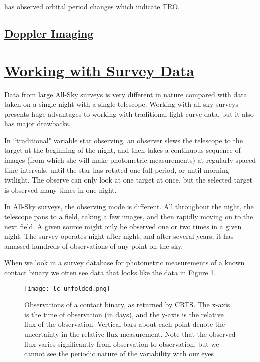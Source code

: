 \documentclass[12pt]{article} %
\numberwithin{equation}{section} %
\begin{document}
\citet{qian2001orbital} has observed orbital period changes which indicate TRO. 

\subsection[Doppler Imaging]{\hyperlink{toc}{Doppler Imaging}} \label{sec: doppler_imaging}



\section[Working with Survey Data]{\hyperlink{toc}{Working with Survey Data}} \label{sec: Working with Survey Data}

Data from large All-Sky surveys is very different in nature compared with data taken on a single night with a single telescope. Working with all-sky surveys presents huge advantages to working with traditional light-curve data, but it also has major drawbacks.

In ``traditional" variable star observing, an observer slews the telescope to the target at the beginning of the night, and then takes a continuous sequence of images (from which she will make photometric measurements) at regularly spaced time intervals, until the star has rotated one full period, or until morning twilight. The observe can only look at one target at once, but the selected target is observed many times in one night.

In All-Sky surveys, the observing mode is different. All throughout the night, the telescope pans to a field, taking a few images, and then rapidly moving on to the next field. A given source might only be observed one or two times in a given night. The survey operates night after night, and after several years, it has amassed hundreds of observations of any point on the sky.

When we look in a survey database for photometric measurements of a known contact binary we often see data that looks like the data in Figure \ref{fig: lc_unfolded}. 

\begin{figure}[H]
\centering
\texttt{[image: lc\_unfolded.png]}
\caption{Observations of a contact binary, as returned by CRTS. The x-axis is the time of observation (in days), and the y-axis is the relative flux of the observation. Vertical bars about each point denote the uncertainty in the relative flux measurement. Note that the observed flux varies significantly from observation to observation, but we cannot see the periodic nature of the variability with our eyes}
\label{fig: lc_unfolded}
\end{figure}
\end{document}
